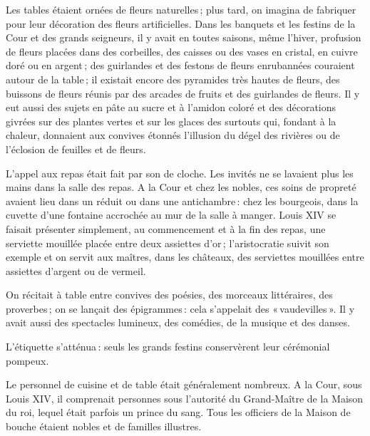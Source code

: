 Les tables étaient ornées de fleurs naturelles ; plus tard, on imagina de
fabriquer pour leur décoration des fleurs artificielles. Dans les banquets
et les festins de la Cour et des grands seigneurs, il y avait en toutes saisons,
même l'hiver, profusion de fleurs placées dans des corbeilles, des caisses ou
des vases en cristal, en cuivre doré ou en argent ; des guirlandes et des
festons de fleurs enrubannées couraient autour de la table ; il existait encore
des pyramides très hautes de fleurs, des buissons de fleurs réunis par des
arcades de fruits et des guirlandes de fleurs. Il y eut aussi des sujets en
pâte au sucre et à l'amidon coloré et des décorations givrées sur des plantes
vertes et sur les glaces des surtouts qui, fondant à la chaleur, donnaient aux
convives étonnés l'illusion du dégel des rivières ou de l'éclosion de feuilles
et de fleurs.

L'appel aux repas était fait par son de cloche. Les invités ne se lavaient plus
les mains dans la salle des repas. A la Cour et chez les nobles, ces soins de
propreté avaient lieu dans un réduit ou dans une antichambre : chez les
bourgeois, dans la cuvette d'une fontaine accrochée au mur de la salle
à manger. Louis XIV se faisait présenter simplement, au commencement et à la
fin des repas, une serviette mouillée placée entre deux assiettes d'or ;
l'aristocratie suivit son exemple et on servit aux maîtres, dans les châteaux,
des serviettes mouillées entre assiettes d'argent ou de vermeil.

On récitait à table entre convives des poésies, des morceaux littéraires, des
proverbes ; on se lançait des épigrammes : cela s'appelait des « vaudevilles ». Il
y avait aussi des spectacles lumineux, des comédies, de la musique et des danses.

L'étiquette s'atténua : seuls les grands festins conservèrent leur cérémonial
pompeux.

Le personnel de cuisine et de table était généralement nombreux. A la Cour,
sous Louis XIV, il comprenait {\mmm} personnes sous l'autorité du
Grand-Maître de la Maison du roi, lequel était parfois un prince du sang. Tous
les officiers de la Maison de bouche étaient nobles et de familles illustres.


